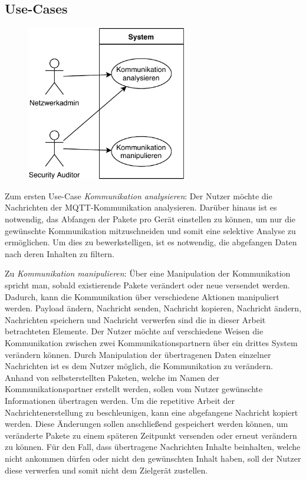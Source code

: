     \subsection{Use-Cases}
    \begin{figure}[h]%
        \centering
        \includegraphics[width=7cm]{tex/bilder/3_anforderungen/Use-Case.pdf}
        \label{fig:use-case}
    \end{figure}
    
    Zum ersten Use-Case \emph{Kommunikation analysieren}:
    	Der Nutzer möchte die Nachrichten der \ac{MQTT}-Kommunikation analysieren.
    	Darüber hinaus ist es notwendig, das Abfangen der Pakete pro Gerät einstellen zu können, um nur die gewünschte Kommunikation mitzuschneiden und somit eine selektive Analyse zu ermöglichen.
    	Um dies zu bewerkstelligen, ist es notwendig, die abgefangen Daten nach deren Inhalten zu filtern.
    	
    Zu \emph{Kommunikation manipulieren}:
        Über eine Manipulation der Kommunikation spricht man, sobald existierende Pakete verändert oder neue versendet werden. Dadurch, kann die Kommunikation über verschiedene Aktionen manipuliert werden. \glqq Payload ändern\grqq{}, \glqq Nachricht senden\grqq{}, \glqq Nachricht kopieren\grqq{}, \glqq Nachricht ändern\grqq{}, \glqq Nachrichten speichern\grqq{} und \glqq Nachricht verwerfen\grqq{} sind die in dieser Arbeit betrachteten Elemente.
    	Der Nutzer möchte auf verschiedene Weisen die Kommunikation zwischen zwei Kommunikationspartnern über ein drittes System verändern können.
    	Durch Manipulation der übertragenen Daten einzelner Nachrichten ist es dem Nutzer möglich, die Kommunikation zu verändern.
    	Anhand von selbsterstellten Paketen, welche im Namen der Kommunikationspartner erstellt werden, sollen vom Nutzer gewünschte Informationen übertragen werden.
    	Um die repetitive Arbeit der Nachrichtenerstellung zu beschleunigen, kann eine abgefangene Nachricht kopiert werden.
    	Diese Änderungen sollen anschließend gespeichert werden können, um veränderte Pakete zu einem späteren Zeitpunkt versenden oder erneut verändern zu können.
    	Für den Fall, dass übertragene Nachrichten Inhalte beinhalten, welche nicht ankommen dürfen oder nicht den gewünschten Inhalt haben, soll der Nutzer diese verwerfen und somit nicht dem Zielgerät zustellen.

